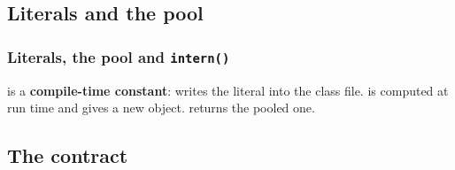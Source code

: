 \documentclass[aspectratio=169,10pt,compress]{beamer}
\begin{document}
\subsection[Pool]{Literals and the pool}




\begin{frame}[t,fragile] \frametitle{Literals, the pool and \texttt{intern()}}

  \vspace{0.3em}
  \small 
   is a \textbf{compile-time constant}: 
   writes the literal  into the class file.
   is computed at run time and gives a new object. 
   returns the pooled one.
\end{frame}


\subsection[Contract]{The contract}
\end{document}
